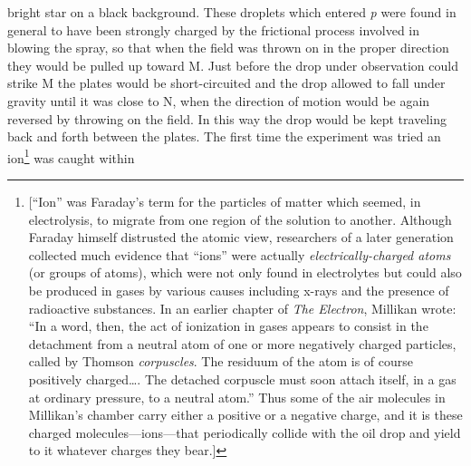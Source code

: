 bright star on a black background. These droplets which entered \emph{p}
were found in general to have been strongly charged by the frictional
process involved in blowing the spray, so that when the field was thrown
on in the proper direction they would be pulled up toward M. Just before
the drop under observation could strike M the plates would be
short-circuited and the drop allowed to fall under gravity until it was
close to N, when the direction of motion would be again reversed by
throwing on the field. In this way the drop would be kept traveling back
and forth between the plates. The first time the experiment was tried an
ion\footnote{{[}``Ion'' was Faraday's term for the particles of matter
  which seemed, in electrolysis, to migrate from one region of the
  solution to another. Although Faraday himself distrusted the atomic
  view, researchers of a later generation collected much evidence that
  ``ions'' were actually \emph{electrically-charged atoms} (or groups of
  atoms), which were not only found in electrolytes but could also be
  produced in gases by various causes including x-rays and the presence
  of radioactive substances. In an earlier chapter of \emph{The
  Electron}, Millikan wrote: ``In a word, then, the act of ionization in
  gases appears to consist in the detachment from a neutral atom of one
  or more negatively charged particles, called by Thomson
  \emph{corpuscles}. The residuum of the atom is of course positively
  charged\ldots. The detached corpuscle must soon attach itself, in a
  gas at ordinary pressure, to a neutral atom.'' Thus some of the air
  molecules in Millikan's chamber carry either a positive or a negative
  charge, and it is these charged molecules---ions---that periodically
  collide with the oil drop and yield to it whatever charges they
  bear.{]}} was caught within
%
